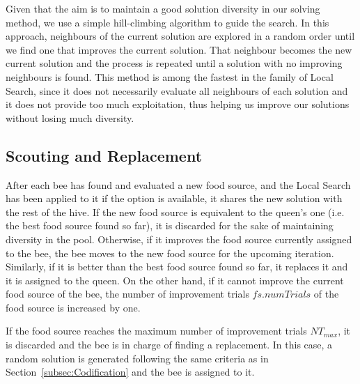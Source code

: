 \documentclass[sn-mathphys]{sn-jnl}%
\theoremstyle{thmstyleone}%
\theoremstyle{thmstyletwo}%
\theoremstyle{thmstylethree}%
\begin{document}
Given that the aim is to maintain a good solution diversity in our solving method, we use a simple hill-climbing algorithm to guide the search. In this approach, neighbours of the current solution are explored in a random order until we find one that improves the current solution. That neighbour becomes the new current solution and the process is repeated until a solution with no improving neighbours is found. This method is among the fastest in the family of Local Search, since it does not necessarily evaluate all neighbours of each solution and it does not provide too much exploitation, thus helping us improve our solutions without losing much diversity.


\subsection{Scouting and Replacement}\label{subsec:Replacement}
After each bee has found and evaluated a new food source, and the Local Search has been applied to it if the option is available, it shares the new solution with the rest of the hive. If the new food source is equivalent to the queen's one (i.e. the best food source found so far), it is discarded for the sake of maintaining diversity in the pool. Otherwise, if it improves the food source currently assigned to the bee, the bee moves to the new food source for the upcoming iteration. Similarly, if it is better than the best food source found so far, it replaces it and it is assigned to the queen. On the other hand, if it cannot improve the current food source of the bee, the number of improvement trials $fs.numTrials$ of the food source is increased by one.

If the food source reaches the maximum number of improvement trials $NT_{max}$, it is discarded and the bee is in charge of finding a replacement. In this case, a random solution is generated following the same criteria as in Section~\ref{subsec:Codification} and the bee is assigned to it.



\end{document}
